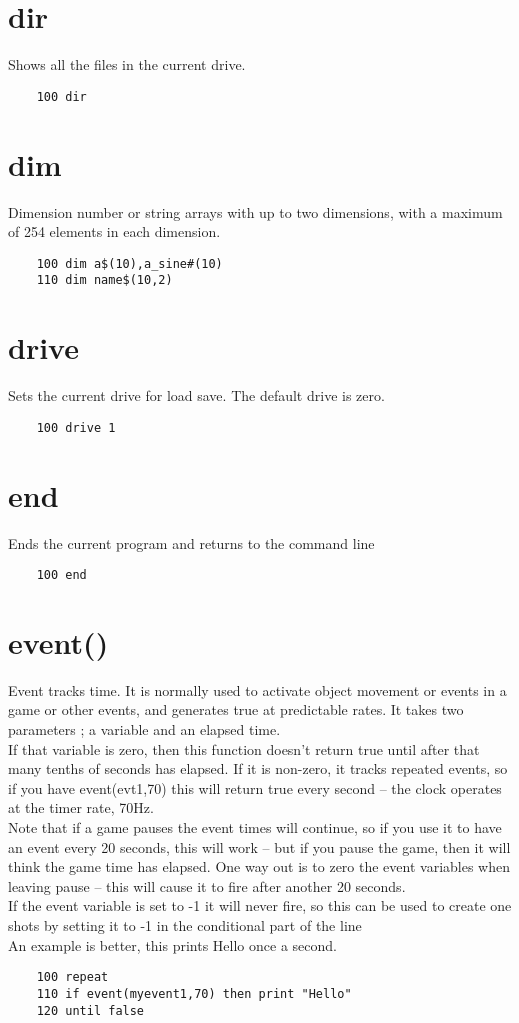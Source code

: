 \section*{dir}
Shows all the files in the current drive.
\example{}
\begin{verbatim}
	100 dir
\end{verbatim}

\section*{dim}
Dimension number or string arrays with up to two dimensions, with a maximum of 254 elements in each dimension.
\example{}
\begin{verbatim}
	100 dim a$(10),a_sine#(10)
	110 dim name$(10,2)
\end{verbatim}

\section*{drive}
Sets the current drive for load save. The default drive is zero.
\example{}
\begin{verbatim}
	100 drive 1
\end{verbatim}

\section*{end}
Ends the current program and returns to the command line
\example{}
\begin{verbatim}
	100 end
\end{verbatim}

\section*{event()}
Event tracks time. It is normally used to activate object movement or events in a game or other events, and generates true at predictable rates. It takes two parameters ; a variable and an elapsed time.\\
If that variable is zero, then this function doesn’t return true until after that many tenths of seconds has elapsed. If it is non-zero, it tracks repeated events, so if you have event(evt1,70) this will return true every second – the clock operates at the timer rate, 70Hz.\\
Note that if a game pauses the event times will continue, so if you use it to have an event every 20 seconds, this will work – but if you pause the game, then it will think the game time has elapsed. One way out is to zero the event variables when leaving pause – this will cause it to fire after another 20 seconds. \\
If the event variable is set to -1 it will never fire, so this can be used to create one shots by setting it to -1 in the conditional part of the line\\
An example is better, this prints Hello once a second.
\example{}
\begin{verbatim}
	100 repeat
	110 if event(myevent1,70) then print "Hello"
	120 until false
\end{verbatim}

